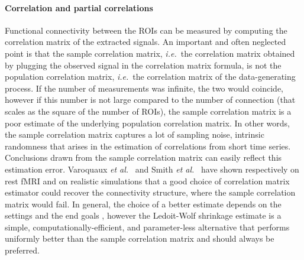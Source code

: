 \documentclass[5p]{elsarticle}
\begin{document}


\paragraph{Correlation and partial correlations}
%
Functional connectivity between the ROIs can be measured by computing the
correlation matrix of the extracted signals. An important and often
neglected point is that the sample correlation matrix, \emph{i.e.}\ the
correlation matrix obtained by plugging the observed signal in the
correlation matrix formula, is not the population correlation matrix,
\emph{i.e.}\ the correlation matrix of the data-generating process. If the
number of measurements was infinite, the two would coincide, however if
this number is not large compared to the number of connection (that
scales as the square of the number of ROIs), the sample correlation
matrix is a poor estimate of the underlying population correlation
matrix. In other words, the sample correlation matrix captures a lot of
sampling noise, intrinsic randomness that arises in the estimation of
correlations from short time series. Conclusions drawn from the sample
correlation matrix can easily reflect this estimation error.
%
Varoquaux \emph{et al.}~\cite{varoquaux2010c} and Smith \emph{et
al.}~\cite{smith2011} have shown respectively on rest fMRI and on
realistic simulations that a good choice of correlation matrix estimator
could recover the connectivity structure, where the sample correlation
matrix would fail. In general, the choice of a better estimate depends on
the settings and the end goals \cite{varoquaux2012,varoquaux2010b},
however the Ledoit-Wolf shrinkage estimate \cite{ledoit2004} is a simple,
computationally-efficient, and parameter-less alternative that performs
uniformly better than the sample correlation matrix
\cite{varoquaux2012,varoquaux2010c} and should always be preferred.
\end{document}
